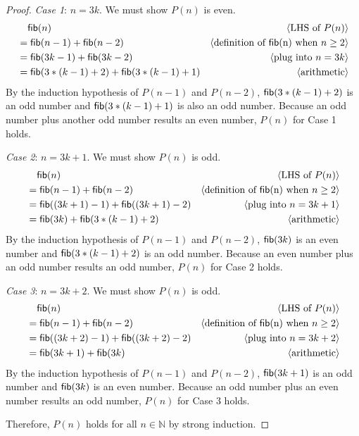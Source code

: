 \documentclass[11pt,fleqn]{article}
\newcommand{\mname}[1]{\mbox{\sf #1}}
\newcommand{\pnote}[1]{{\langle \text{#1} \rangle}}
\begin{document}
\begin{enumerate}
\begin{proof}
    \emph{Case 1}: $n = 3k$. We must show $P(n)$ is even.
    \begin{align*}
      & \phantom{{}=} \mname{fib}(n)	& \pnote{LHS of $P(n)$}\\
      & = \mname{fib} (n - 1) + \mname{fib} (n - 2)		& \pnote{definition of \mname{fib}(n) when $n \ge 2$}\\
      & = \mname{fib} (3k - 1) + \mname{fib} (3k - 2)	& \pnote{plug into $n = 3k$}\\
      & = \mname{fib} (3 * (k - 1) + 2) + \mname{fib} (3 * (k - 1) + 1)	& \pnote{arithmetic}
    \end{align*}
    By the induction hypothesis of $P(n-1)$ and $P(n-2)$, $\mname{fib} (3 * (k - 1) + 2)$ is an odd number 
    and $\mname{fib} (3 * (k - 1) + 1)$ is also an odd number.  Because an odd number plus another odd number results an even number, $P(n)$ for Case 1 holds.

    \emph{Case 2}: $n = 3k + 1$. We must show $P(n)$ is odd.
    \begin{align*}
      & \phantom{{}=} \mname{fib}(n) & \pnote{LHS of $P(n)$}\\
      & = \mname{fib} (n - 1) + \mname{fib} (n - 2) & \pnote{definition of \mname{fib}(n) when $n \ge 2$}\\
      & = \mname{fib} ((3k + 1) - 1) + \mname{fib} ((3k + 1) - 2) & \pnote{plug into $n = 3k + 1$}\\
      & = \mname{fib} (3k) + \mname{fib} (3 * (k - 1) + 2) & \pnote{arithmetic}
    \end{align*}
    By the induction hypothesis of  $P(n-1)$ and $P(n-2)$, $\mname{fib} (3k)$ is an even number 
    and $\mname{fib} (3 * (k - 1) + 2)$ is an odd number. Because an even number plus an odd number results an odd number, $P(n)$ for Case 2 holds.

    \emph{Case 3}: $n = 3k + 2$. We must show $P(n)$ is odd.
    \begin{align*}
      & \phantom{{}=} \mname{fib}(n) & \pnote{LHS of $P(n)$}\\
      & = \mname{fib} (n - 1) + \mname{fib} (n - 2) & \pnote{definition of \mname{fib}(n) when $n \ge 2$}\\
      & = \mname{fib} ((3k + 2) - 1) + \mname{fib} ((3k + 2) - 2) & \pnote{plug into $n = 3k + 2$}\\
      & = \mname{fib} (3k + 1) + \mname{fib} (3k) & \pnote{arithmetic}
    \end{align*}
    By the induction hypothesis of $P(n-1)$ and $P(n-2)$, $\mname{fib} (3k + 1)$ is an odd number 
    and $\mname{fib} (3k)$ is an even number. Because an odd number plus an even number results an odd number, $P(n)$ for Case 3 holds.

    \medskip

    Therefore, $P(n)$ holds for all $n \in \mathbb{N}$ by strong induction.
  \end{proof} 

\end{enumerate}
\end{document}
